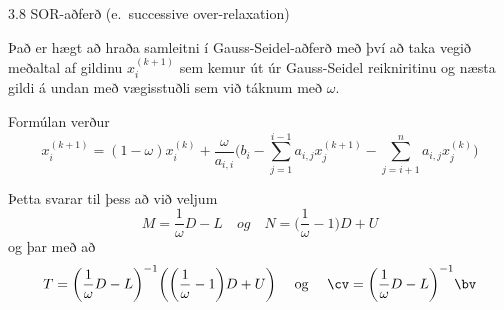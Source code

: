 \begin{frame}{3.8 SOR-aðferð (e.~successive over-relaxation)} 

Það er hægt að hraða samleitni í Gauss-Seidel-aðferð með því að 
taka vegið meðaltal af gildinu $x_i^{(k+1)}$ sem kemur út úr
Gauss-Seidel reikniritinu og næsta gildi á undan með vægisstuðli sem
við táknum með $\omega$.  

\pause
\smallskip
Formúlan verður
$$
x_i^{(k+1)}=(1-\omega)x_i^{(k)}+\dfrac \omega{a_{i,i}}\bigg(
b_i-\sum_{j=1}^{i-1}a_{i,j}x_j^{(k+1)}-\sum_{j=i+1}^n a_{i,j}x_j^{(k)}\bigg)
$$

\pause
\smallskip
Þetta svarar til þess að  við veljum 
$$
M=\dfrac 1\omega D-L \quad { og } \quad   
N=\bigg(\dfrac 1\omega -1\bigg) D+U
$$
og þar með að
$$
T=\bigg(\dfrac 1\omega D-L\bigg)^{-1}
\bigg(\bigg(\dfrac 1\omega-1\bigg)D+ U\bigg) 
\quad \text{ og } \quad \cv=\bigg(\dfrac 1\omega D-L\bigg)^{-1} \bv
$$
\end{frame}


%


